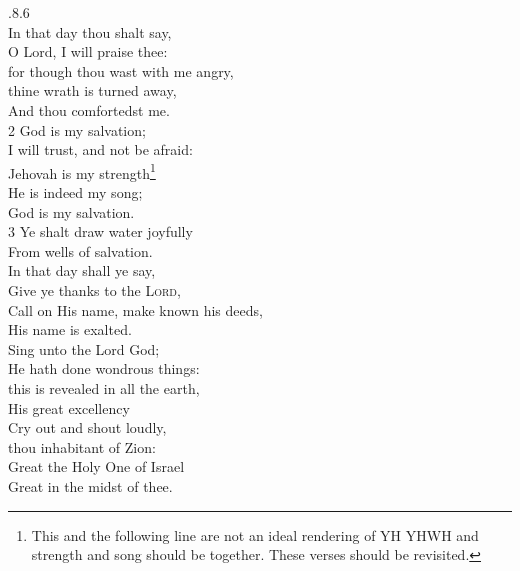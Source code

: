 \documentclass{article}
\begin{document}
\begin{multicols}{2}
.8.6\\


 In that day thou shalt say,\\
O Lord, I will praise thee:\\
for though thou wast with me angry,\\ 
thine wrath is turned away,\\
 
\noindent And thou comfortedst me.\\
2 God is my salvation; \\
I will trust, and not be afraid:\\
Jehovah is my strength\footnote
{This and the following line are not an ideal rendering of YH YHWH and strength and song should be together.  These verses should be revisited.}\\

\noindent He is indeed my song;\\ 
God is my salvation.\\
3 Ye shalt draw water joyfully\\ 
From wells of salvation.\\

 In that day shall ye say,\\ 
Give ye thanks to the \textsc{Lord},\\ 
Call on His name, make known his deeds,\\
His name is exalted.\\

 Sing unto the Lord God;\\
He hath done wondrous things:\\
this is revealed in all the earth,\\
His great excellency\\

 Cry out and shout loudly,\\
thou inhabitant of Zion:\\
Great the Holy One of Israel\\
Great in the midst of thee.\\

\end{multicols}
\end{document}
